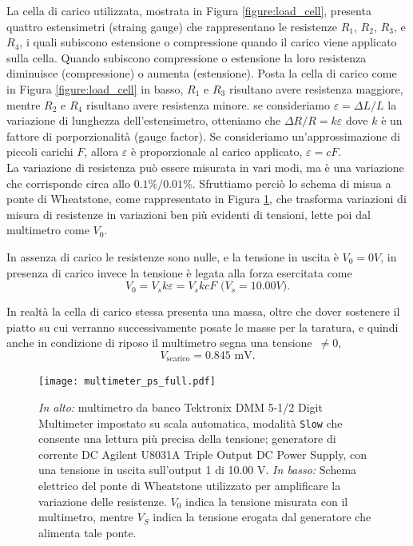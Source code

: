 \documentclass[italian, a4paper, 10pt, twocolumn]{../../style/lab_unige}
\newcommand{\reffig}[1]{Figura {\ref{#1}}}%
\begin{document}
    La cella di carico utilizzata, mostrata in \reffig{figure:load_cell}, presenta quattro estensimetri (straing gauge) che rappresentano le resistenze $R_1$, $R_2$, $R_3$, e $R_4$, i quali subiscono estensione o compressione quando il carico viene applicato sulla cella. Quando subiscono compressione o estensione la loro resistenza diminuisce (compressione) o aumenta (estensione). Posta la cella di carico come in \reffig{figure:load_cell} in basso, $R_1$ e $R_3$ risultano avere resistenza maggiore, mentre $R_2$ e $R_4$ risultano avere resistenza minore. se consideriamo $\varepsilon=\Delta L/L$ la variazione di lunghezza dell'estensimetro, otteniamo che $\Delta R/R = k\varepsilon$ dove $k$ è un fattore di porporzionalità (gauge factor). Se consideriamo un’approssimazione di piccoli carichi $F$, allora $\varepsilon$ è proporzionale al carico applicato, $\varepsilon=cF$.\\
    La variazione di resistenza può essere misurata in vari modi, ma è una variazione che corrisponde circa allo $0.1\%/0.01\%$. Sfruttiamo perciò lo schema di misua a ponte di Wheatstone, come rappresentato in \reffig{figure:multimeter_ps}, che trasforma variazioni di misura di resistenze in variazioni ben più evidenti di tensioni, lette poi dal multimetro come $V_0$.

    In assenza di carico le resistenze sono nulle, e la tensione in uscita è $V_0=0V$, in presenza di carico invece la tensione è legata alla forza esercitata come
    \begin{equation}
        V_0=V_sk\varepsilon=V_skcF\text{ ($V_s=10.00V$).}\label{equation:v0_f}
    \end{equation}

    In realtà la cella di carico stessa presenta una massa, oltre che dover sostenere il piatto su cui verranno successivamente posate le masse per la taratura, e quindi anche in condizione di riposo il multimetro segna una tensione~$\neq0$, 
    \[V_{\text{scarico}}=0.845\text{ mV.}\]

    \begin{figure}
        \centering
        \texttt{[image: multimeter\_ps\_full.pdf]}
        \caption{\textit{In alto:} multimetro da banco Tektronix DMM 5-1/2 Digit Multimeter impostato su scala automatica, modalità \texttt{Slow} che consente una lettura più precisa della tensione; generatore di corrente DC Agilent U8031A Triple Output DC Power Supply, con una tensione in uscita sull'output 1 di 10.00 V. \textit{In basso:} Schema elettrico del ponte di Wheatstone utilizzato per amplificare la variazione delle resistenze. $V_0$ indica la tensione misurata con il multimetro, mentre $V_S$ indica la tensione erogata dal generatore che alimenta tale ponte.}
        \label{figure:multimeter_ps}
    \end{figure}
\end{document}

